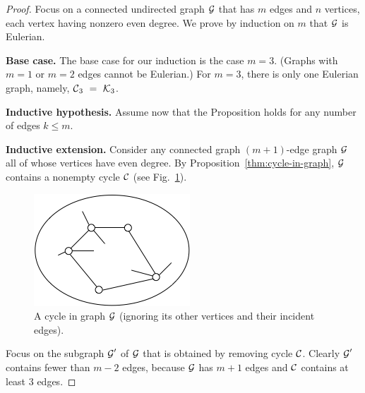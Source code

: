 \begin{proof}
\smallskip

Focus on a connected undirected graph $\mbox{$\cal G$}$ that has $m$ edges and $n$ vertices, each
vertex having nonzero even degree.  We prove by induction on $m$ that $\mbox{$\cal G$}$ is Eulerian.


{\bf Base case.}
The base case for our induction is the case $m=3$.  (Graphs with $m=1$ or $m=2$ edges
cannot be Eulerian.)  For $m=3$, there is only one Eulerian graph, namely, $\mbox{$\cal C$}_3 \ = \ \mbox{$\cal K$}_3$.

\smallskip

{\bf Inductive hypothesis.}
Assume now that the Proposition holds for any number of edges $k \leq m$.

\smallskip

{\bf Inductive extension.}
Consider any connected graph $(m+1)$-edge graph $\mbox{$\cal G$}$ all of whose vertices have even degree.
By Proposition~\ref{thm:cycle-in-graph}, $\mbox{$\cal G$}$ contains a nonempty cycle $\mbox{$\cal C$}$
(see Fig.~\ref{fig:eulerianProof1}). 
\begin{figure}[hbt]
\begin{center}
       \includegraphics[scale=0.5]{FiguresGraph/EulerianProof1}
       \caption{A cycle in graph $\mbox{$\cal G$}$ (ignoring its other vertices and their incident edges).}
  \label{fig:eulerianProof1}
\end{center}
\end{figure}
Focus on the subgraph $\mbox{$\cal G$}'$ of $\mbox{$\cal G$}$ that is obtained by removing cycle $\mbox{$\cal C$}$.  Clearly $\mbox{$\cal G$}'$
contains fewer than $m-2$ edges, because $\mbox{$\cal G$}$ has $m+1$ edges and $\mbox{$\cal C$}$ contains at
least $3$ edges.


\end{proof}
